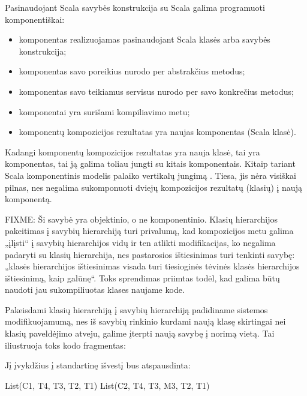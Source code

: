 Pasinaudojant Scala savybės konstrukcija su Scala galima programuoti
komponentiškai:
\begin{itemize}
  \item komponentas realizuojamas pasinaudojant Scala klasės arba
    savybės konstrukcija;
  \item komponentas savo poreikius nurodo per abstrakčius metodus;
  \item komponentas savo teikiamus servisus nurodo per savo konkrečius
    metodus;
  \item komponentai yra surišami kompiliavimo metu;
  \item komponentų kompozicijos rezultatas yra naujas komponentas
    (Scala klasė).
\end{itemize}
Kadangi komponentų kompozicijos rezultatas yra nauja klasė, tai yra
komponentas, tai ją galima toliau jungti su kitais komponentais.
Kitaip tariant Scala komponentinis modelis palaiko vertikalų
jungimą
\cite[598p.]{classification-framework-for-scm}.
Tiesa, jis nėra visiškai pilnas, nes negalima sukomponuoti dviejų
kompozicijos rezultatų (klasių) į naują komponentą.

FIXME: Ši savybė yra objektinio, o ne komponentinio.
Klasių hierarchijos pakeitimas į savybių hierarchiją turi privalumą,
kad kompozicijos metu galima „įlįsti“ į savybių hierarchijos vidų ir ten
atlikti modifikacijas, ko negalima padaryti su klasių hierarchija,
nes pastarosios ištiesinimas turi tenkinti savybę: „klasės hierarchijos
ištiesinimas visada turi tiesioginės tėvinės klasės hierarchijos
ištiesinimą, kaip galūnę“\cite[57p.]{scala-reference}. Toks sprendimas
priimtas todėl, kad galima būtų naudoti jau sukompiliuotas klases
naujame kode.

\begin{exmp}
  Pakeisdami klasių hierarchiją į savybių hierarchiją padidiname
  sistemos modifikuojamumą, nes iš savybių rinkinio kurdami naują
  klasę skirtingai nei klasių paveldėjimo atveju, galime įterpti
  naują savybę į norimą vietą. Tai iliustruoja toks kodo fragmentas:


  Jį įvykdžius į standartinę išvestį bus atspausdinta:

  \begin{textcode}
    List(C1, T4, T3, T2, T1)
    List(C2, T4, T3, M3, T2, T1)
  \end{textcode}

\end{exmp}

